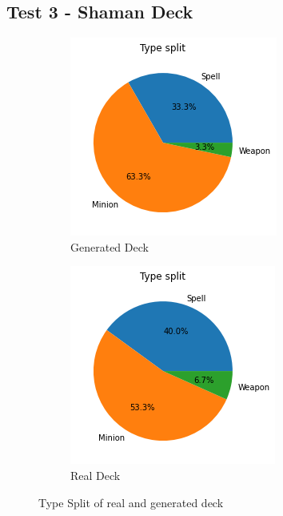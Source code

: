 \documentclass{report} %
\begin{document}
\subsection{Test 3 - Shaman Deck}
\begin{figure}[H]
\centering
\begin{subfigure}{.5\textwidth}
 \centering
 \includegraphics[width=.75\linewidth]{TestImages/ShamanDeckSplitFake}
 \caption{Generated Deck}
\end{subfigure}%
\begin{subfigure}{.5\textwidth}
 \centering
 \includegraphics[width=.75\linewidth]{TestImages/ShamanDeckSplitReal}
 \caption{Real Deck}
\end{subfigure}
\caption{Type Split of real and generated deck}
\end{figure}
\end{document}
